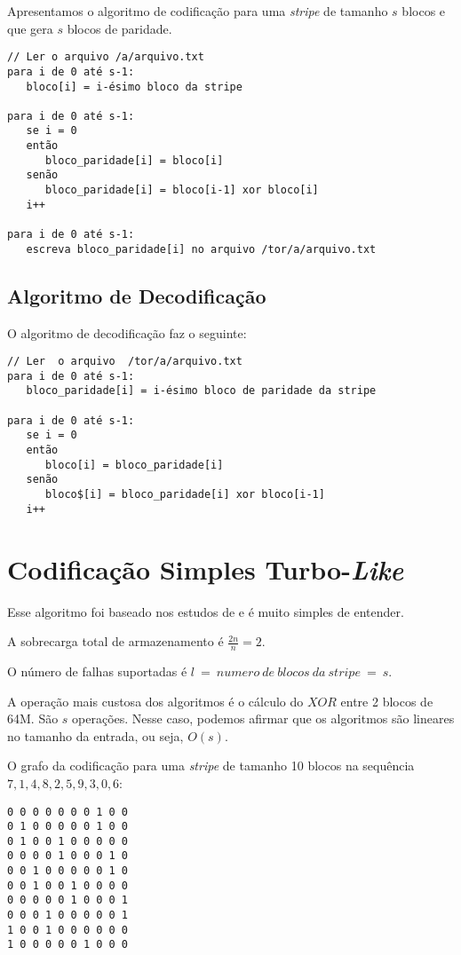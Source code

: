 Apresentamos o algoritmo de codificação para uma \emph{stripe} de tamanho $s$ blocos e que gera $s$ blocos de paridade. 

\begin{verbatim}
// Ler o arquivo /a/arquivo.txt
para i de 0 até s-1:
   bloco[i] = i-ésimo bloco da stripe

para i de 0 até s-1:
   se i = 0
   então
      bloco_paridade[i] = bloco[i]
   senão
      bloco_paridade[i] = bloco[i-1] xor bloco[i]
   i++

para i de 0 até s-1:
   escreva bloco_paridade[i] no arquivo /tor/a/arquivo.txt
\end{verbatim}

\subsection{Algoritmo de Decodificação}

O algoritmo de decodificação faz o seguinte:

\begin{verbatim}
// Ler  o arquivo  /tor/a/arquivo.txt
para i de 0 até s-1:
   bloco_paridade[i] = i-ésimo bloco de paridade da stripe

para i de 0 até s-1:
   se i = 0
   então
      bloco[i] = bloco_paridade[i]
   senão
      bloco$[i] = bloco_paridade[i] xor bloco[i-1]
   i++
\end{verbatim}

\section{Codificação Simples Turbo-\emph{Like}}

Esse algoritmo foi baseado nos estudos de \cite{Divsalar:1998,MacKay:2003} e é muito simples de entender. 

A sobrecarga total de armazenamento é $\frac{2n}{n}=2$.

O número de falhas suportadas é $l\ =\ numero\ de\ blocos\ da\ stripe\ =\ s$.

A operação mais custosa dos algoritmos é o cálculo do $XOR$ entre 2 blocos de 64M. São $s$ operações. Nesse caso, podemos afirmar que os algoritmos são lineares no tamanho da entrada, ou seja, $O(s)$.

O grafo da codificação para uma \emph{stripe} de tamanho 10 blocos na sequência $7, 1, 4, 8, 2, 5, 9, 3, 0, 6$:

\begin{verbatim}
0 0 0 0 0 0 0 1 0 0
0 1 0 0 0 0 0 1 0 0
0 1 0 0 1 0 0 0 0 0
0 0 0 0 1 0 0 0 1 0
0 0 1 0 0 0 0 0 1 0
0 0 1 0 0 1 0 0 0 0
0 0 0 0 0 1 0 0 0 1
0 0 0 1 0 0 0 0 0 1
1 0 0 1 0 0 0 0 0 0
1 0 0 0 0 0 1 0 0 0
\end{verbatim}


